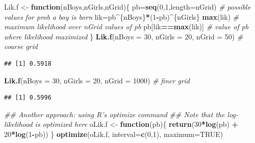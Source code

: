 \documentclass[
]{krantz}
\newenvironment{Shaded}{\begin{snugshade}}{\end{snugshade}}
\newcommand{\CommentTok}[1]{\textcolor[rgb]{0.37,0.37,0.37}{\textit{#1}}}
\newcommand{\ControlFlowTok}[1]{\textcolor[rgb]{0.27,0.27,0.27}{\textbf{#1}}}
\newcommand{\DataTypeTok}[1]{\textcolor[rgb]{0.27,0.27,0.27}{#1}}
\newcommand{\DecValTok}[1]{\textcolor[rgb]{0.06,0.06,0.06}{#1}}
\newcommand{\KeywordTok}[1]{\textcolor[rgb]{0.27,0.27,0.27}{\textbf{#1}}}
\newcommand{\NormalTok}[1]{#1}
\newcommand{\OperatorTok}[1]{\textcolor[rgb]{0.43,0.43,0.43}{\textbf{#1}}}
\newcommand{\OtherTok}[1]{\textcolor[rgb]{0.37,0.37,0.37}{#1}}
\newcommand{\StringTok}[1]{\textcolor[rgb]{0.5,0.5,0.5}{#1}}
\begin{document}
\begin{Shaded}
\begin{Highlighting}[]
\NormalTok{Lik.f <-}\StringTok{ }\ControlFlowTok{function}\NormalTok{(nBoys,nGirls,nGrid)\{}
\NormalTok{    pb=}\KeywordTok{seq}\NormalTok{(}\DecValTok{0}\NormalTok{,}\DecValTok{1}\NormalTok{,}\DataTypeTok{length=}\NormalTok{nGrid)   }\CommentTok{# possible values for prob a boy is born}
\NormalTok{    lik=pb}\OperatorTok{^}\NormalTok{\{nBoys\}}\OperatorTok{*}\NormalTok{(}\DecValTok{1}\OperatorTok{-}\NormalTok{pb)}\OperatorTok{^}\NormalTok{\{nGirls\}}
    \KeywordTok{max}\NormalTok{(lik)             }\CommentTok{# maximum likelihood over nGrid values of pb}
\NormalTok{    pb[lik}\OperatorTok{==}\KeywordTok{max}\NormalTok{(lik)]    }\CommentTok{# value of pb where likelihood maximized}
\NormalTok{  \}}
\KeywordTok{Lik.f}\NormalTok{(}\DataTypeTok{nBoys =} \DecValTok{30}\NormalTok{, }\DataTypeTok{nGirls =} \DecValTok{20}\NormalTok{, }\DataTypeTok{nGrid =} \DecValTok{50}\NormalTok{)    }\CommentTok{# coarse grid}
\end{Highlighting}
\end{Shaded}

\begin{verbatim}
## [1] 0.5918
\end{verbatim}

\begin{Shaded}
\begin{Highlighting}[]
\KeywordTok{Lik.f}\NormalTok{(}\DataTypeTok{nBoys =} \DecValTok{30}\NormalTok{, }\DataTypeTok{nGirls =} \DecValTok{20}\NormalTok{, }\DataTypeTok{nGrid =} \DecValTok{1000}\NormalTok{)  }\CommentTok{# finer grid}
\end{Highlighting}
\end{Shaded}

\begin{verbatim}
## [1] 0.5996
\end{verbatim}

\begin{Shaded}
\begin{Highlighting}[]
\CommentTok{## Another approach: using R's optimize command}
\CommentTok{##   Note that the log-likelihood is optimized here}
\NormalTok{oLik.f <-}\StringTok{ }\ControlFlowTok{function}\NormalTok{(pb)\{}
    \KeywordTok{return}\NormalTok{(}\DecValTok{30}\OperatorTok{*}\KeywordTok{log}\NormalTok{(pb) }\OperatorTok{+}\StringTok{ }\DecValTok{20}\OperatorTok{*}\KeywordTok{log}\NormalTok{(}\DecValTok{1}\OperatorTok{-}\NormalTok{pb))}
\NormalTok{  \}}
\KeywordTok{optimize}\NormalTok{(oLik.f, }\DataTypeTok{interval=}\KeywordTok{c}\NormalTok{(}\DecValTok{0}\NormalTok{,}\DecValTok{1}\NormalTok{), }\DataTypeTok{maximum=}\OtherTok{TRUE}\NormalTok{)}
\end{Highlighting}
\end{Shaded}
\end{document}
